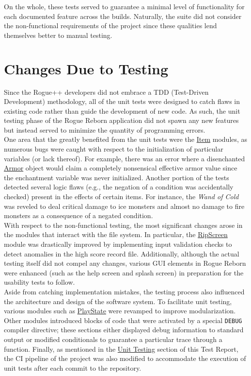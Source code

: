 \documentclass[12pt, titlepage]{article}
\newcommand{\newsection}[1]{
  \newpage
  \section{#1}
}
\begin{document}
	On the whole, these tests served to guarantee a minimal level of functionality for each documented feature across the builds.  Naturally, the suite did not consider the non-functional requirements of the project since these qualities lend themselves better to manual testing.  

\newsection{Changes Due to Testing} \label{Section_Changes}
	Since the Rogue++ developers did not embrace a TDD (Test-Driven Development) methodology, all of the unit tests were designed to catch flaws in existing code rather than guide the development of new code.  As such, the  unit testing phase of the Rogue Reborn application did not spawn any new features but instead served to minimize the quantity of programming errors.\\

	One area that the greatly benefited from the unit tests were the \hyperref[Section_M_Trace]{Item} modules, as numerous bugs were caught with respect to the initialization of particular variables (or lack thereof).  For example, there was an error where a disenchanted \hyperref[Section_M_Trace]{Armor} object would claim a completely nonsensical effective armor value since the enchantment variable was never initialized.  Another portion of the tests detected several logic flaws (e.g., the negation of a condition was accidentally checked) present in the effects of certain items.  For instance, the \textit{Wand of Cold} was reveled to deal critical damage to ice monsters and almost no damage to fire monsters as a consequence of a negated condition.\\

	With respect to the non-functional testing, the most significant changes arose in the modules that interact with the file system.  In particular, the \hyperref[Section_M_Trace]{RipScreen} module was drastically improved by implementing input validation checks to detect anomalies in the high score record file.  Additionally, although the actual testing itself did not compel any changes, various GUI elements in Rogue Reborn were enhanced (such as the help screen and splash screen) in preparation for the usability tests to follow.\\

	Aside from catching implementation mistakes, the testing process also influenced the architecture and design of the software system.  To facilitate unit testing, various modules such as \hyperref[Section_M_Trace]{PlayState} were revamped to improve modularization.  Other modules introduced blocks of code that were activated by a special \lstinline$DEBUG$ compiler directive; these sections either displayed debug information to standard output or modified conditionals to guarantee a particular trace through a function.  Finally, as mentioned in the \hyperref[Section_UT]{Unit Testing} section of this Test Report, the CI pipeline of the project was also modified to accommodate the execution of unit tests after each commit to the repository.
\end{document}
